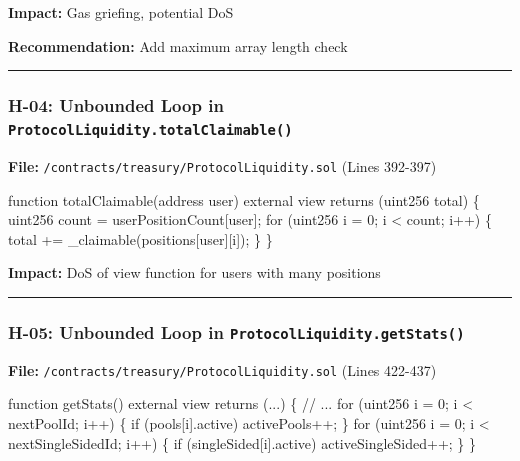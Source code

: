 \documentclass[
]{article}
\newenvironment{Shaded}{}{}
\newcommand{\NormalTok}[1]{#1}
\begin{document}
\textbf{Impact:} Gas griefing, potential DoS

\textbf{Recommendation:} Add maximum array length check

\begin{center}\rule{0.5\linewidth}{0.5pt}\end{center}

\subsubsection{\texorpdfstring{H-04: Unbounded Loop in
\texttt{ProtocolLiquidity.totalClaimable()}}{H-04: Unbounded Loop in ProtocolLiquidity.totalClaimable()}}\label{h-04-unbounded-loop-in-protocolliquiditytotalclaimable}

\textbf{File:} \texttt{/contracts/treasury/ProtocolLiquidity.sol} (Lines
392-397)

\begin{Shaded}
\begin{Highlighting}[]
\NormalTok{function totalClaimable(address user) external view returns (uint256 total) \{}
\NormalTok{    uint256 count = userPositionCount[user];}
\NormalTok{    for (uint256 i = 0; i \textless{} count; i++) \{}
\NormalTok{        total += \_claimable(positions[user][i]);}
\NormalTok{    \}}
\NormalTok{\}}
\end{Highlighting}
\end{Shaded}

\textbf{Impact:} DoS of view function for users with many positions

\begin{center}\rule{0.5\linewidth}{0.5pt}\end{center}

\subsubsection{\texorpdfstring{H-05: Unbounded Loop in
\texttt{ProtocolLiquidity.getStats()}}{H-05: Unbounded Loop in ProtocolLiquidity.getStats()}}\label{h-05-unbounded-loop-in-protocolliquiditygetstats}

\textbf{File:} \texttt{/contracts/treasury/ProtocolLiquidity.sol} (Lines
422-437)

\begin{Shaded}
\begin{Highlighting}[]
\NormalTok{function getStats() external view returns (...) \{}
\NormalTok{    // ...}
\NormalTok{    for (uint256 i = 0; i \textless{} nextPoolId; i++) \{}
\NormalTok{        if (pools[i].active) activePools++;}
\NormalTok{    \}}
\NormalTok{    for (uint256 i = 0; i \textless{} nextSingleSidedId; i++) \{}
\NormalTok{        if (singleSided[i].active) activeSingleSided++;}
\NormalTok{    \}}
\NormalTok{\}}
\end{Highlighting}
\end{Shaded}
\end{document}
